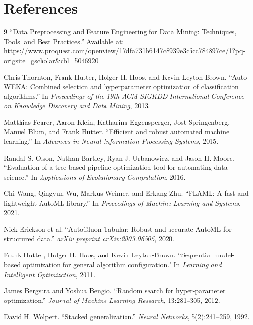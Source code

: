 \documentclass[12pt,a4paper]{report}
\begin{document}
\chapter*{References}
\begin{thebibliography}{9}
``Data Preprocessing and Feature Engineering for Data Mining: Techniques,
Tools, and Best Practices.'' Available at:
\url{https://www.proquest.com/openview/17dfa731b6147c8939e3c5cc784897ce/1?pq-origsite=gscholar&cbl=5046920}

Chris Thornton, Frank Hutter, Holger H. Hoos, and Kevin Leyton-Brown.
``Auto-WEKA: Combined selection and hyperparameter optimization of
classification algorithms.'' In \emph{Proceedings of the 19th ACM SIGKDD
International Conference on Knowledge Discovery and Data Mining}, 2013.

Matthias Feurer, Aaron Klein, Katharina Eggensperger, Jost Springenberg,
Manuel Blum, and Frank Hutter. ``Efficient and robust automated machine
learning.'' In \emph{Advances in Neural Information Processing Systems}, 2015.

Randal S. Olson, Nathan Bartley, Ryan J. Urbanowicz, and Jason H. Moore.
``Evaluation of a tree-based pipeline optimization tool for automating data
science.'' In \emph{Applications of Evolutionary Computation}, 2016.

Chi Wang, Qingyun Wu, Markus Weimer, and Erkang Zhu. ``FLAML: A fast and
lightweight AutoML library.'' In \emph{Proceedings of Machine Learning and
Systems}, 2021.

Nick Erickson et al. ``AutoGluon-Tabular: Robust and accurate AutoML for
structured data.'' \emph{arXiv preprint arXiv:2003.06505}, 2020.

Frank Hutter, Holger H. Hoos, and Kevin Leyton-Brown. ``Sequential model-based
optimization for general algorithm configuration.'' In \emph{Learning and
Intelligent Optimization}, 2011.

James Bergstra and Yoshua Bengio. ``Random search for hyper-parameter
optimization.'' \emph{Journal of Machine Learning Research}, 13:281--305,
2012.

David H. Wolpert. ``Stacked generalization.'' \emph{Neural Networks},
5(2):241--259, 1992.
\end{thebibliography}

\appendix
\end{document}

